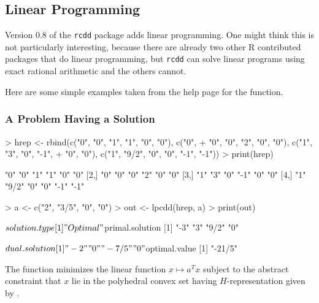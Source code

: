 \documentclass{article}
\begin{document}
\subsection{Linear Programming}

Version 0.8 of the \texttt{rcdd} package adds linear programming.
One might think this is not particularly interesting, because there
are already two other R contributed packages that do linear programming,
but \texttt{rcdd} can solve linear programs using exact rational arithmetic
and the others cannot.

Here are some simple examples taken from the help page for the 
function.

\subsubsection{A Problem Having a Solution}

\begin{Schunk}
\begin{Sinput}
> hrep <- rbind(c("0", "0", "1", "1", "0", "0"), c("0", 
+     "0", "0", "2", "0", "0"), c("1", "3", "0", "-1", 
+     "0", "0"), c("1", "9/2", "0", "0", "-1", "-1"))
> print(hrep)
\end{Sinput}
\begin{Soutput}
     [,1] [,2]  [,3] [,4] [,5] [,6]
[1,] "0"  "0"   "1"  "1"  "0"  "0" 
[2,] "0"  "0"   "0"  "2"  "0"  "0" 
[3,] "1"  "3"   "0"  "-1" "0"  "0" 
[4,] "1"  "9/2" "0"  "0"  "-1" "-1"
\end{Soutput}
\begin{Sinput}
> a <- c("2", "3/5", "0", "0")
> out <- lpcdd(hrep, a)
> print(out)
\end{Sinput}
\begin{Soutput}
$solution.type
[1] "Optimal"

$primal.solution
[1] "-3"  "3"   "9/2" "0"  

$dual.solution
[1] "-2"   "0"    "-7/5" "0"   

$optimal.value
[1] "-21/5"
\end{Soutput}
\end{Schunk}

The function \verb@lpcdd@ minimizes the linear function $x \mapsto a^T x$
subject to the abstract constraint that $x$ lie in the polyhedral convex
set having $H$-representation given by \verb@hrep@.
\end{document}
